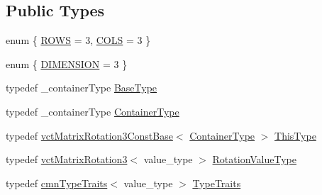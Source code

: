 \subsection*{Public Types}
\begin{DoxyCompactItemize}
\item 
enum \{ \hyperlink{classvct_matrix_rotation3_const_base_a559a478b4507d44a75aab17fcc1c6277a24a90e4fecc47d3868084e10241213b5}{R\+O\+W\+S} = 3, 
\hyperlink{classvct_matrix_rotation3_const_base_a559a478b4507d44a75aab17fcc1c6277a4e0ad6e4f34b6d668a5db06227afa293}{C\+O\+L\+S} = 3
 \}
\item 
enum \{ \hyperlink{classvct_matrix_rotation3_const_base_a6bc9712dde55ee3fca0d7880feb6a903afdf02f4ad230d81f0ca2539c7feb61f3}{D\+I\+M\+E\+N\+S\+I\+O\+N} = 3
 \}
\item 
typedef \+\_\+container\+Type \hyperlink{classvct_matrix_rotation3_const_base_a1f40b2353fc88d70bf853d4557eaae99}{Base\+Type}
\item 
typedef \+\_\+container\+Type \hyperlink{classvct_matrix_rotation3_const_base_a59e670b3a79131c32fa5ce28a9275509}{Container\+Type}
\item 
typedef \hyperlink{classvct_matrix_rotation3_const_base}{vct\+Matrix\+Rotation3\+Const\+Base}$<$ \hyperlink{classvct_matrix_rotation3_const_base_a59e670b3a79131c32fa5ce28a9275509}{Container\+Type} $>$ \hyperlink{classvct_matrix_rotation3_const_base_ad26bf016ce37ea0532e1ce0aa7bba8a0}{This\+Type}
\item 
typedef \hyperlink{classvct_matrix_rotation3}{vct\+Matrix\+Rotation3}$<$ value\+\_\+type $>$ \hyperlink{classvct_matrix_rotation3_const_base_a913ecee79856db867ac6d45d27cfe362}{Rotation\+Value\+Type}
\item 
typedef \hyperlink{classcmn_type_traits}{cmn\+Type\+Traits}$<$ value\+\_\+type $>$ \hyperlink{classvct_matrix_rotation3_const_base_af73335dedec5af83c5715335bbc8fce1}{Type\+Traits}
\end{DoxyCompactItemize}
